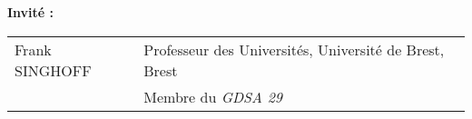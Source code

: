 {\vspace{\baselineskip}
{\normalsize \textbf{Invit\'{e} :}}\\ \newline
\footnotesize
\begin{tabular}{@{}ll}
Frank SINGHOFF & Professeur des Universités, Université de Brest, Brest\\
 & Membre du \textit{GDSA 29}
\end{tabular}

\vspace{0.6cm}
}


\maketitle
